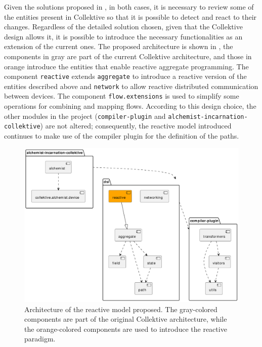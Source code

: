 Given the solutions proposed in , in both cases, it is necessary to review some of the entities present in Collektive so that it is possible to detect and react to their changes. Regardless of the detailed solution chosen, given that the Collektive design allows it, it is possible to introduce the necessary functionalities as an extension of the current ones. The proposed architecture is shown in , the components in gray are part of the current Collektive architecture, and those in orange introduce the entities that enable reactive aggregate programming. The component \texttt{reactive} extends \texttt{aggregate} to introduce a reactive version of the entities described above and \texttt{network} to allow reactive distributed communication between devices. The component \texttt{flow.extensions} is used to simplify some operations for combining and mapping flows. According to this design choice, the other modules in the project (\texttt{compiler-plugin} and \texttt{alchemist-incarnation-collektive}) are not altered; consequently, the reactive model introduced continues to make use of the compiler plugin for the definition of the paths.

\begin{figure}
    \centering
    \includegraphics[width=\linewidth]{figures/collektive-prm-architecture.pdf}
    \caption{Architecture of the reactive model proposed. The gray-colored components are part of the original Collektive architecture, while the orange-colored components are used to introduce the reactive paradigm.}
    \label{fig:collektive-prm-architecture}
\end{figure}

